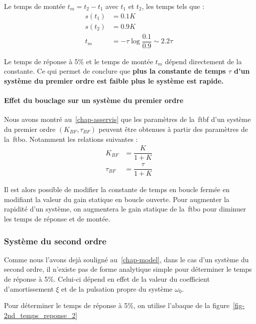 Le temps de montée $t_m=t_2-t_1$ avec $t_1$ et $t_2$, les temps tels que :
\begin{align*}
    s(t_1)&=0.1K\\
    s(t_2)&=0.9K\\
    t_m   &=-\tau\log{\dfrac{0.1}{0.9}}\sim2.2\tau
\end{align*}

Le temps de réponse à 5\% et le temps de montée $t_m$ dépend directement
de la constante. Ce qui permet de conclure que 
\textbf{plus la constante de temps $\tau$ d'un système du premier
ordre est faible plus le système est rapide.}

\paragraph{Effet du bouclage sur un système du premier ordre}
Nous avons montré au~\cref{chap-asservis} que les paramètres de 
la~\gls{ftbf} d'un système du premier ordre $(K_{BF},\tau_{BF})$ peuvent 
être obtenues à partir des paramètres de la~\gls{ftbo}. Notamment les relations
suivantes :
\begin{align*}
       K_{BF}&=\dfrac{K}{1+K}\\
    \tau_{BF}&=\dfrac{\tau}{1+K}
\end{align*}

Il est alors possible de modifier la constante de temps en boucle fermée en 
modifiant la valeur du gain statique en boucle ouverte. Pour augmenter
la rapidité d'un système, on augmentera le gain statique de la~\gls{ftbo} pour
diminuer les temps de réponse et de montée.

\subsubsection{Système du second ordre}
Comme nous l'avons dejà souligné au~\cref{chap-model}, dans le cas d'un système  
du second ordre, il n'existe pas de forme analytique simple pour déterminer 
le temps de réponse à 5\%. Celui-ci dépend en effet de la valeur du coefficient 
d'amortissement $\xi$ et de la pulsation propre du système $\omega_0$.

Pour déterminer le temps de réponse à 5\%, on utilise l'abaque de la 
figure~\cref{fig-2nd_temps_reponse_2}


